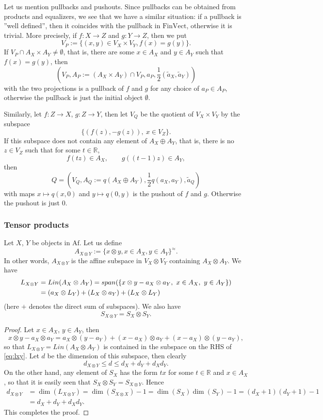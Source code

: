 \documentclass[12pt]{article}
\theoremstyle{definition}
\theoremstyle{remark}
\def \Af{\mathrm{Af}}
\def \FV{\mathrm{FinVect}}
\def\bX{ X}
\def\bY{ Y}
\def\bZ{Z}
\begin{document}
Let us mention pullbacks and pushouts. Since pullbacks can be obtained from products and
equalizers, we see that we have a similar situation: if a pullback is ''well defined'',
then it coincides with the pullback in $\FV$, otherwise it is trivial. More precisely, if 
$f:\bX\to \bZ$ and $g:\bY\to \bZ$, then we put 
\[
V_P:=\{(x,y)\in V_\bX\times V_\bY, f(x)=g(y)\}.
\]
If $V_P\cap A_\bX\times A_\bY\ne \emptyset$, that is, there are some $x\in A_\bX$ and $y\in
A_\bY$ such that $f(x)=g(y)$, then 
\[
(V_P,A_P:=(A_\bX\times A_\bY)\cap V_P, a_P, \frac 12(\tilde a_X,\tilde a_Y))
\]
with the two projections
is a pullback of $f$ and $g$ for any choice of $a_P\in A_P$, otherwise the pullback is
just the initial object $\emptyset$.

Similarly, let $f:\bZ\to \bX$, $g:\bZ\to \bY$, then let $V_Q$ be the quotient of
$V_\bX\times V_\bY$ by the subspace
\[
\{(f(z),-g(z)),\ x\in V_\bZ\}.
\]
If this subspace does not contain any element of $A_\bX\oplus A_\bY$, that is, there is no
$z\in V_\bZ$ such that for some $t\in \mathbb R$,
\[
f(tz)\in A_\bX,\qquad g((t-1)z)\in A_\bY,
\]
then 
\[
Q=(V_Q, A_Q:=q(A_\bX\oplus A_\bY), \frac12 q(a_X,a_Y), \tilde a_Q)
\]
with maps $x\mapsto q(x,0)$ and $y\mapsto q(0,y)$ is the
pushout of $f$ and $g$. Otherwise the pushout is just $0$.

\subsubsection{Tensor products}

Let $X$, $Y$ be objects in $\Af$. Let us define
\[
A_{X\otimes Y}:=\{x\otimes y, x\in A_X, y\in A_Y\}^{\approx}.
\]
In other words, $A_{X\otimes Y}$ is the affine subspace in $V_X\otimes V_Y$ containing
$A_X\otimes A_Y$. We have
\begin{align}
L_{X\otimes Y}&=Lin(A_X\otimes A_Y)=span(\{x\otimes y-a_X\otimes a_Y,\ x\in A_X,\ y\in
A_Y\})\notag\\
&= (a_X\otimes L_Y)+ (L_X\otimes a_Y)+ (L_X\otimes L_Y)\label{eq:lxy}
\end{align}
(here $+$ denotes the direct sum of subspaces). We also have
\[
S_{X\otimes Y}=S_X\otimes S_Y.
\]

\begin{proof} Let $x\in A_X$, $y\in A_Y$, then
\[
x\otimes y-a_X\otimes a_Y=a_X\otimes (y-a_Y)+(x-a_X)\otimes a_Y+(x-a_X)\otimes (y-a_Y),
\]
so that $L_{X\otimes Y}=Lin(A_X\otimes A_Y)$ is contained in the subspace on the RHS of \eqref{eq:lxy}.
Let $d$ be the dimension of this subspace, then clearly
\[
d_{X\otimes Y}\le d\le d_X+d_Y+d_Xd_Y.
\]
On the other hand, any element of $S_X$ has the form $tx$ for some $t\in \mathbb R$ and
$x\in A_X$, so that it is easily seen that $S_X\otimes S_Y=S_{X\otimes Y}$. 
Hence 
\begin{align*}
d_{X\otimes Y}&=\dim(L_{X\otimes Y})=\dim(S_{X\otimes
X})-1=\dim(S_X)\dim(S_Y)-1=(d_X+1)(d_Y+1)-1\\
&=d_X+d_Y+d_Xd_Y.
\end{align*}
This completes the proof.

\end{proof}
\end{document}
